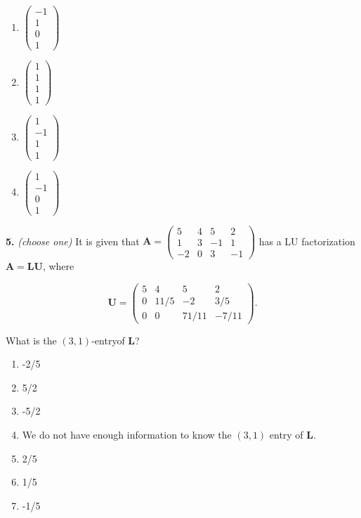 \documentclass[10pt,a4paper]{article}
\begin{document}
\begin{enumerate}[label=(\Alph*)]
\item \(\begin{pmatrix}-1\\1\\0\\1\end{pmatrix}\)
\item \(\begin{pmatrix}1\\1\\1\\1\end{pmatrix}\)
\item \(\begin{pmatrix}1\\-1\\1\\1\end{pmatrix}\)
\item \(\begin{pmatrix}1\\-1\\0\\1\end{pmatrix}\)
\end{enumerate}
\smallskip
\textbf{5.} \textit{(choose one)} It is given that \(\mathbf{A}=\begin{pmatrix}        5       &       4      &        5      &        2       \\        1       &       3      &       -1     &         1       \\       -2      &        0     &         3     &        -1    \end{pmatrix}\) has a LU factorization \(\mathbf{A=LU}\), where

\[\mathbf{U}=\begin{pmatrix}        5     &         4          &    5        &      2       \\        0     &        11/5     &      -2    &          3/5     \\        0     &         0          &   71/11  &        -7/11    \end{pmatrix}.\]

What is the \((3,1)\)-entryof \(\mathbf{L}\)?

\begin{enumerate}[label=(\Alph*)]
\item -2/5
\item 5/2
\item -5/2
\item We do not have enough information to know the \((3,1)\) entry of \(\mathbf{L}\).
\item 2/5
\item 1/5
\item -1/5
\end{enumerate}
\smallskip
\end{document}

